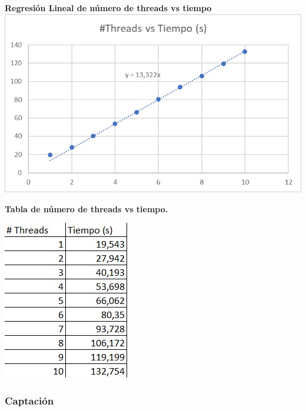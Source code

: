\documentclass[a4paper]{article}
\begin{document}
\begin{center}
    \textbf{Regresión Lineal de número de threads vs tiempo}
    \includegraphics[scale=0.5]{reg_lineal.jpeg}

    \textbf{Tabla de número de threads vs tiempo.}

    \includegraphics[scale=0.7]{tabla.jpeg}
\end{center}
\subsubsection{Captación}
\end{document}
